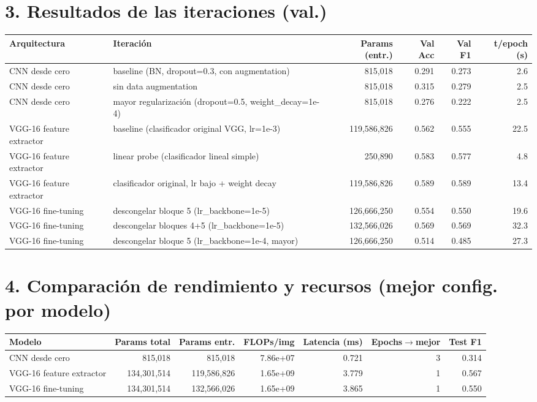 \documentclass[9pt]{article}
\begin{document}
\section*{3. Resultados de las iteraciones (val.)}
\scriptsize
\begin{center}
\begin{tabular}{p{2.6cm}p{4.6cm}rrrr}
\toprule
\textbf{Arquitectura} & \textbf{Iteración} & \textbf{Params (entr.)} & \textbf{Val Acc} & \textbf{Val F1} & \textbf{t/epoch (s)} \\
\midrule
CNN desde cero & baseline (BN, dropout=0.3, con augmentation) & 815,018 & 0.291 & 0.273 & 2.6 \\
CNN desde cero & sin data augmentation & 815,018 & 0.315 & 0.279 & 2.5 \\
CNN desde cero & mayor regularización (dropout=0.5, weight\_decay=1e-4) & 815,018 & 0.276 & 0.222 & 2.5 \\
VGG-16 feature extractor & baseline (clasificador original VGG, lr=1e-3) & 119,586,826 & 0.562 & 0.555 & 22.5 \\
VGG-16 feature extractor & linear probe (clasificador lineal simple) & 250,890 & 0.583 & 0.577 & 4.8 \\
VGG-16 feature extractor & clasificador original, lr bajo + weight decay & 119,586,826 & 0.589 & 0.589 & 13.4 \\
VGG-16 fine-tuning & descongelar bloque 5 (lr\_backbone=1e-5) & 126,666,250 & 0.554 & 0.550 & 19.6 \\
VGG-16 fine-tuning & descongelar bloques 4+5 (lr\_backbone=1e-5) & 132,566,026 & 0.569 & 0.569 & 32.3 \\
VGG-16 fine-tuning & descongelar bloque 5 (lr\_backbone=1e-4, mayor) & 126,666,250 & 0.514 & 0.485 & 27.3 \\
\bottomrule
\end{tabular}
\end{center}

\section*{4. Comparación de rendimiento y recursos (mejor config. por modelo)}
\scriptsize
\begin{center}
\begin{tabular}{p{2.9cm}rrrrrr}
\toprule
\textbf{Modelo} & \textbf{Params total} & \textbf{Params entr.} & \textbf{FLOPs/img} & \textbf{Latencia (ms)} & \textbf{Epochs$\to$mejor} & \textbf{Test F1} \\
\midrule
CNN desde cero & 815,018 & 815,018 & 7.86e+07 & 0.721 & 3 & 0.314 \\
VGG-16 feature extractor & 134,301,514 & 119,586,826 & 1.65e+09 & 3.779 & 1 & 0.567 \\
VGG-16 fine-tuning & 134,301,514 & 132,566,026 & 1.65e+09 & 3.865 & 1 & 0.550 \\
\bottomrule
\end{tabular}
\end{center}
\end{document}
